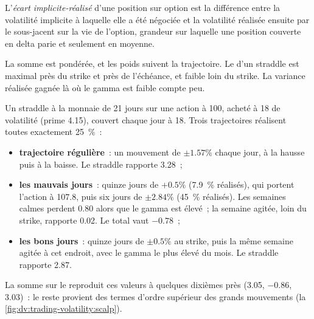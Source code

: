 \begin{definition}\label{def:dv:trading-volatility:spread}
L'\emph{écart implicite-réalisé} d'une position sur option est la différence entre la volatilité implicite à laquelle elle a été négociée et la
volatilité réalisée ensuite par le sous-jacent sur la vie de l'option, grandeur sur laquelle une position couverte en delta parie
et seulement en moyenne.
\end{definition}

La somme est pondérée, et les poids suivent la trajectoire. Le  d'un straddle est maximal près du strike et près de l'échéance, et faible loin
du strike. La variance réalisée gagnée là où le gamma est faible compte peu.

\begin{example}\label{ex:dv:trading-volatility:days}
Un straddle à la monnaie de 21 jours sur une action à 100, acheté à 18 de volatilité (prime 4.15), couvert chaque jour à 18. Trois trajectoires réalisent toutes exactement
25~\%~:
\begin{itemize}
\item \textbf{trajectoire régulière}~: un mouvement de $\pm1.57\%$ chaque jour, à la hausse puis à la baisse. Le straddle rapporte 3.28~;
\item \textbf{les mauvais jours}~: quinze jours de $+0.5\%$ (7.9~\% réalisés), qui portent l'action à 107.8, puis six jours de $\pm2.84\%$ (45~\%
réalisés). Les semaines calmes perdent 0.80 alors que le gamma est élevé~; la semaine agitée, loin du strike, rapporte 0.02. Le total vaut $-0.78$~;
\item \textbf{les bons jours}~: quinze jours de $\pm0.5\%$ au strike, puis la même semaine agitée à cet endroit, avec le gamma le plus élevé du mois. Le
straddle rapporte 2.87.
\end{itemize}
La somme sur le  reproduit ces valeurs à quelques dixièmes près (3.05, $-0.86$, 3.03)~: le reste provient des termes d'ordre supérieur des grands mouvements
(la \cref{fig:dv:trading-volatility:scalp}).
\end{example}

